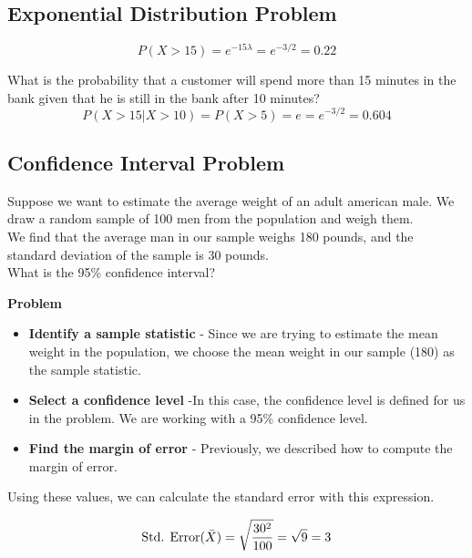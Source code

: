 \documentclass[]{report}
\begin{document}
\begin{enumerate}[(i)]
{\subsection{Exponential Distribution Problem}
		
		
		\[
		P (X > 15) = e ^{-15\lambda}
		= e ^{-3 / 2}
		= 0.22
		\]
		
		
		What is the probability that a customer will spend more than 15 minutes in the bank given that he is still in the bank after 10 minutes?
		\[
		P (X > 15|X > 10) = P (X > 5) = e
		= e ^{-3 / 2}
		= 0.604
		\]
		
\subsection{Confidence Interval Problem}
	
	Suppose we want to estimate the average weight of an adult american male. We draw a random sample of 100 men from the population  and weigh them.\\ \vspace{0.3cm} We find that the average man in our sample weighs 180 pounds, and the standard deviation of the sample is 30 pounds.\\ What is the 95\% confidence interval?
	
	
	
\noindent  \textbf{Problem}
	
	\begin{itemize}
		\item
		\textbf{Identify a sample statistic} - Since we are trying to estimate the mean weight in the population, we choose the mean weight in our sample (180) as the sample statistic.
		
		
		\item \textbf{Select a confidence level}  -In this case, the confidence level is defined for us in the problem. We are working with a 95\% confidence level.
		
		
		\item \textbf{Find the margin of error} - Previously, we described how to compute the margin of error.
	\end{itemize}
	
	
	

	
	Using these values, we can calculate the standard error with this expression.
	
	\vspace{0.1cm}
	\[
	\mbox{Std. Error}(\bar{X})  = \sqrt{{30^2\over 100}} = \sqrt{9}
	= 3\]
	
}
\end{enumerate}
\end{document}
